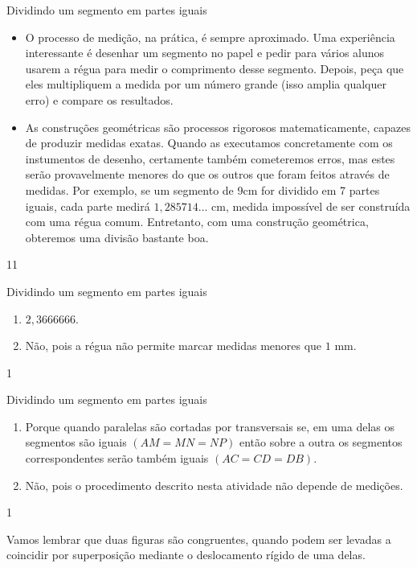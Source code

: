 \begin{sugestions}{Dividindo um segmento em partes iguais}
{
\begin{itemize}
\item {} 
O processo de medição, na prática, é sempre aproximado. Uma experiência interessante é desenhar um segmento no papel e pedir para vários alunos usarem a régua para medir o comprimento desse segmento. Depois, peça que eles multipliquem a medida por um número grande (isso amplia qualquer erro) e compare os resultados.

\item {} 
As construções geométricas são processos rigorosos matematicamente, capazes de produzir medidas exatas. Quando as executamos concretamente com os instumentos de desenho, certamente também cometeremos erros, mas estes serão provavelmente menores do que os outros que foram feitos através de medidas. Por exemplo, se um segmento de 9cm for dividido em 7 partes iguais, cada parte medirá $1{,}285714\dots$ cm, medida impossível de ser construída com uma régua comum. Entretanto, com uma construção geométrica, obteremos uma divisão bastante boa.

\end{itemize}
}{1}{1}
\end{sugestions}
\begin{answer}{Dividindo um segmento em partes iguais}
{
\begin{enumerate}
\item {} 
$2{,}3666666$.

\item {} 
Não, pois a régua não permite marcar medidas menores que $1$ mm.
\end{enumerate}
}{1}
\end{answer}
\clearmargin
\begin{answer}{Dividindo um segmento em partes iguais}
{
\begin{enumerate}
\item {} 
Porque quando paralelas são cortadas por transversais se, em uma delas os segmentos são iguais \((AM = MN = NP)\) então sobre a outra os segmentos correspondentes serão também iguais \((AC = CD = DB)\).

\item {} 
Não, pois o procedimento descrito nesta atividade não depende de medições.
\end{enumerate}
}{1}
\end{answer}
\def\currentcolor{session4}

Vamos lembrar que duas figuras são congruentes, quando podem ser levadas a coincidir por superposição mediante o deslocamento rígido de uma delas.

